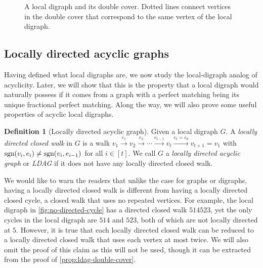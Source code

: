 \documentclass[reqno,11pt]{amsart}
\numberwithin{equation}{section}
\theoremstyle{definition}
\newtheorem{definition}[theorem]{Definition}
\theoremstyle{remark}
\begin{document}
\begin{figure}[h]
    \caption{A local digraph and its double cover. Dotted lines connect vertices in the double cover that correspond to the same vertex of the local digraph.}
    \label{fig:double-cover}
\end{figure}

\subsection{Locally directed acyclic graphs}

Having defined what local digraphs are, we now study the local-digraph analog of acyclicity.
Later, we will show that this is the property that a local digraph would naturally possess if it comes from a graph with a perfect matching being its unique fractional perfect matching.
Along the way, we will also prove some useful properties of acyclic local digraphs.


\begin{definition}[Locally directed acyclic graph]\label{def:ldag}
    Given a local digraph $G$. A \emph{locally directed closed walk} in $G$ is a walk $v_1\xrightarrow{e_1}v_2\xrightarrow{e_2}\cdots\xrightarrow{e_{t-1}}v_t\xrightarrow{e_t=e_0}v_{t+1}=v_1$ with $\textup{sgn}(v_i,e_i)\neq \textup{sgn}(v_i,e_{i-1})$ for all $i\in[t]$.
    We call $G$ a \emph{locally directed acyclic graph} or \emph{LDAG} if it does not have any locally directed closed walk.
\end{definition}

We would like to warn the readers that unlike the case for graphs or digraphs, having a locally directed closed walk is different from having a locally directed closed cycle, a closed walk that uses no repeated vertices.
For example, the local digraph in \cref{fig:no-directed-cycle} has a directed closed walk $514523$, yet the only cycles in the local digraph are $514$ and $523$, both of which are not locally directed at $5$.
However, it is true that each locally directed closed walk can be reduced to a locally directed closed walk that uses each vertex at most twice.
We will also omit the proof of this claim as this will not be used, though it can be extracted from the proof of \cref{prop:ldag-double-cover}.
\end{document}
